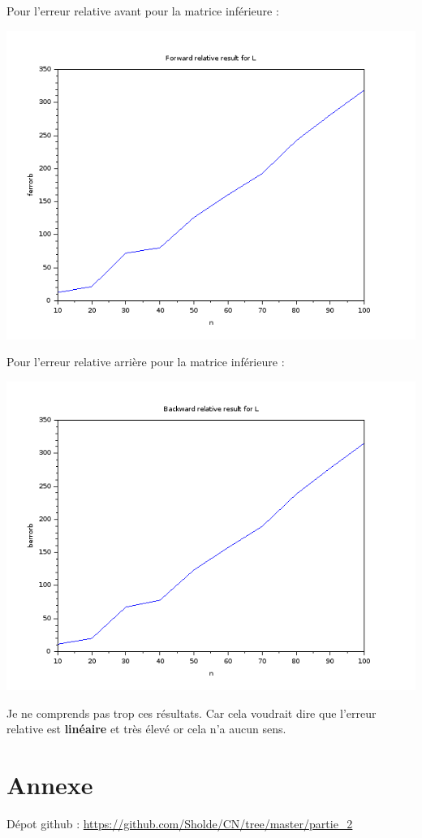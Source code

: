 \documentclass{article}
\begin{document}
Pour l'erreur relative avant pour la matrice inférieure :

\includegraphics[scale=0.5]{img/L_ferrorb.png}

Pour l'erreur relative arrière pour la matrice inférieure :

\includegraphics[scale=0.5]{img/L_berrorb.png}

Je ne comprends pas trop ces résultats. Car cela voudrait dire que
l'erreur relative est \textbf{linéaire} et très élevé or cela n'a
aucun sens.

\section*{Annexe}

Dépot github : \url{https://github.com/Sholde/CN/tree/master/partie_2}
\end{document}
